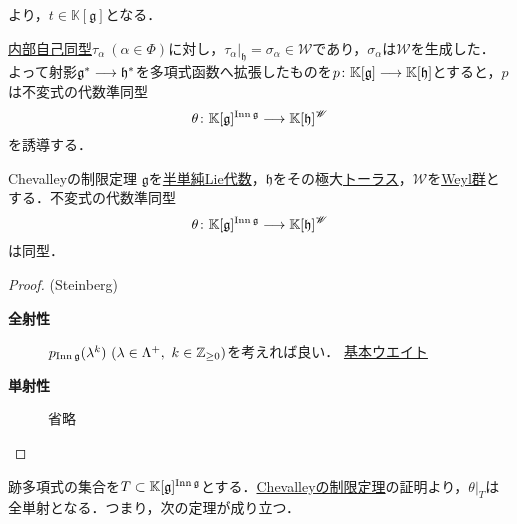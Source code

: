\documentclass[rep_main]{subfiles}
\begin{document}
より，$t \in \mathbb{K}[\mathfrak{g}]$となる．


\hyperref[def:inner-LieAlg]{内部自己同型}$\tau_\alpha\ (\alpha \in \Phi)$に対し，$\tau_\alpha|_\mathfrak{h} = \sigma_\alpha \in \mathscr{W}$であり，$\sigma_\alpha$は$\mathscr{W}$を生成した．\\
よって射影$\mathfrak{g}^* \longrightarrow \mathfrak{h}^*$を多項式函数へ拡張したものを$p\colon \mathbb{K}[\mathfrak{g}] \longrightarrow \mathbb{K}[\mathfrak{h}]$とすると，$p$は不変式の代数準同型
\begin{equation}
	\theta \colon \mathbb{K}[\mathfrak{g}]^{\operatorname{Inn}\mathfrak{g}} \longrightarrow \mathbb{K}[\mathfrak{h}]^\mathscr{W}
\end{equation}
を誘導する．
\begin{mytheo}[label=thm:Chevalley-restriction]{Chevalleyの制限定理}
	$\mathfrak{g}$を\hyperref[def:semisimple-LieAlg]{半単純Lie代数}，$\mathfrak{h}$をその極大\hyperref[def:toral-subLieAlg]{トーラス}，$\mathscr{W}$を\hyperref[def:Weylgroup]{Weyl群}とする．不変式の代数準同型
	\begin{equation}
		\theta\colon \mathbb{K}[\mathfrak{g}]^{\operatorname{Inn}\mathfrak{g}} \longrightarrow \mathbb{K}[\mathfrak{h}]^\mathscr{W}
	\end{equation}
	は同型．
\end{mytheo}
\begin{proof}(Steinberg)
	\begin{description}
		\item[\textbf{全射性}] $p_{\operatorname{Inn} \mathfrak{g}}(\lambda^k)\ (\lambda \in \Lambda^+,\ k \in \mathbb{Z}_{\geq 0})$を考えれば良い．
		\hyperref[def:fundamental-weight]{基本ウエイト}
		\item[\textbf{単射性}] 省略
	\end{description}
\end{proof}
跡多項式の集合を$T \subset \mathbb{K}[\mathfrak{g}]^{\operatorname{Inn}\mathfrak{g}}$とする．\hyperref[thm:Chevalley-restriction]{Chevalleyの制限定理}の証明より，$\theta|_T$は全単射となる．つまり，次の定理が成り立つ．
\end{document}
